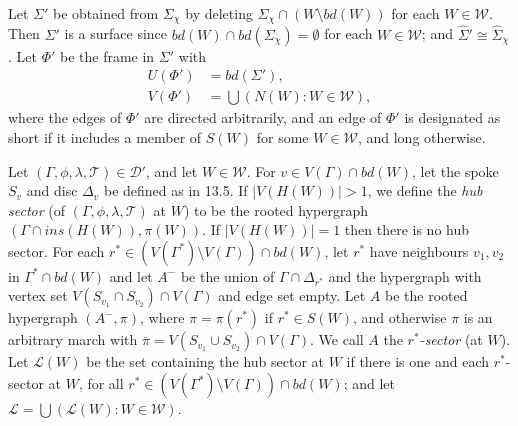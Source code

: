 Let $\Sigma'$ be obtained from $\Sigma_\chi$ by deleting $\Sigma_\chi \cap (W \setminus bd(W))$ for each $W \in \mathscr{W}$. Then $\Sigma'$ is a surface since $bd(W) \cap bd(\Sigma_\chi) = \emptyset$ for each $W \in \mathscr{W}$; and $\hat{\Sigma}' \cong \hat{\Sigma}_\chi$.  Let $\Phi'$ be the frame in $\Sigma'$ with
\begin{align*}
U(\Phi') &= bd(\Sigma'), \\
V(\Phi') &= \bigcup(N(W) : W \in \mathscr{W}),
\end{align*}
where the edges of $\Phi'$ are directed arbitrarily, and an edge of $\Phi'$ is designated as short if it includes a member of $S(W)$ for some $W \in \mathscr{W}$, and long otherwise.

Let $(\Gamma, \phi, \lambda, \mathscr{T}) \in \mathscr{D}'$, and let $W \in \mathscr{W}$. For $v \in V(\Gamma) \cap bd(W)$, let the spoke $S_v$ and disc $\Delta_v$ be defined as in 13.5. If $|V(H(W))| > 1$, we define the \textit{hub sector} (of $(\Gamma, \phi, \lambda, \mathscr{T})$ at $W$) to be the rooted hypergraph $(\Gamma \cap ins(H(W)), \pi(W))$. If $|V(H(W))| = 1$ then there is no hub sector. For each $r^* \in (V(\Gamma^*) \setminus V(\Gamma)) \cap bd(W)$, let $r^*$ have neighbours $v_1, v_2$ in $\Gamma^* \cap bd(W)$ and let $A^-$ be the union of $\Gamma \cap \Delta_{r^*}$ and the hypergraph with vertex set $V(S_{v_1} \cap S_{v_2}) \cap V(\Gamma)$ and edge set empty. Let $A$ be the rooted hypergraph $(A^-, \pi)$, where $\pi = \pi(r^*)$ if $r^* \in S(W)$, and otherwise $\pi$ is an arbitrary march with $\bar{\pi} = V(S_{v_1} \cup S_{v_2}) \cap V(\Gamma)$. We call $A$ the $r^*$\textit{-sector} (at $W$). Let $\mathscr{L}(W)$ be the set containing the hub sector at $W$ if there is one and each $r^*$-sector at $W$, for all $r^* \in (V(\Gamma^*) \setminus V(\Gamma)) \cap bd(W)$; and let $\mathscr{L} = \bigcup(\mathscr{L}(W) : W \in \mathscr{W})$.

